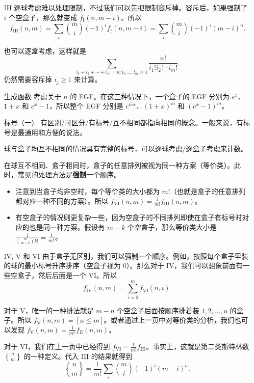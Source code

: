 \begin{frame}{III}
    逐球考虑难以处理限制，不过我们可以先把限制容斥掉。容斥后，如果强制了 $i$ 个空盒子，那么就变成 $f_{\mathrm{I}}(n,m-i)$。所以
    $$
    f_{\mathrm{III}}(n,m)=\sum_i\binom{m}{i}(-1)^i f_{\mathrm{I}}(n,m-i)=\sum_{i}\binom{m}{i}(-1)^i (m-i)^n.
    $$

    也可以逐盒考虑，这样就是
    $$
    \sum_{i_1+i_2+\cdots+i_m=n;i_1,\ldots,i_m\ge 1}\frac{n!}{i_1!i_2!\cdots i_m!}.
    $$
    仍然需要容斥掉 $i_j\ge 1$ 来计算。
\end{frame}
\begin{frame}{生成函数}
    考虑关于 $n$ 的 EGF。在这三种情况下，一个盒子的 EGF 分别为 $e^x$、$1+x$ 和 $e^x-1$，所以整个 EGF 分别是 $e^{mx}$、$(1+x)^m$ 和 $(e^x-1)^m$。
\end{frame}
\begin{frame}{标号（一）}
    有区别/可区分/有标号/互不相同都指向相同的概念。一般来说，有标号是最通用和方便的说法。

    球与盒子均互不相同的情况具有完整的标号，可以逐球考虑/逐盒子考虑来计数。

    在球互不相同、盒子相同时，盒子的任意排列被视为同一种方案（等价类）。此时，常见的处理方法是\textbf{强制}一个顺序。
        \begin{itemize}
            \item 注意到当盒子均非空时，每个等价类的大小都为 $m!$（也就是盒子的任意排列都对应一种不同的方案）。所以 $f_{\mathrm{VI}}(n,m)=\frac{1}{m!}f_{\mathrm{III}}(n,m)$。
            \item 有空盒子的情况则更复杂一些，因为空盒子的不同排列即使在盒子有标号时对应的也是同一种方案。假设有 $m-k$ 个空盒子，那么等价类大小是 $\frac{1}{\binom{m}{m-k} k!}=\frac{1}{m^{\underline{k}}}$。
        \end{itemize}
\end{frame}
\begin{frame}{IV, V 和 VI}
    由于盒子无区别，我们可以强制一个顺序。例如，按照每个盒子里装的球的最小标号升序排序（空盒子视为 $0$）。那么对于 IV，我们可以想象前面有一些空盒子，然后后面是一个 VI。所以
    $$
    f_{\mathrm{IV}}(n,m)=\sum_{i=0}^m f_{\mathrm{VI}}(n,i).
    $$

    对于 V，唯一的一种排法就是 $m-n$ 个空盒子后面按顺序排着装 $1,2,\ldots,n$ 的盒子。所以 $f_{\mathrm{V}}(n,m)=[n\le m]$。或者通过上一页中对等价类的分析，我们也可以发现 $f_{\mathrm{V}}(n,m)=\frac{1}{m^{\underline{n}}}f_{\mathrm{II}}(n,m)$。

    对于 VI，我们在上一页中已经得到 $f_{\mathrm{VI}}=\frac{1}{m!}f_{\mathrm{III}}$。事实上，这就是第二类斯特林数 $n\brace m$ 的一种定义。代入 III 的结果就得到
    $$
    {n\brace m}=\frac{1}{m!}\sum_i\binom{m}{i}(-1)^i(m-i)^n.
    $$
\end{frame}
